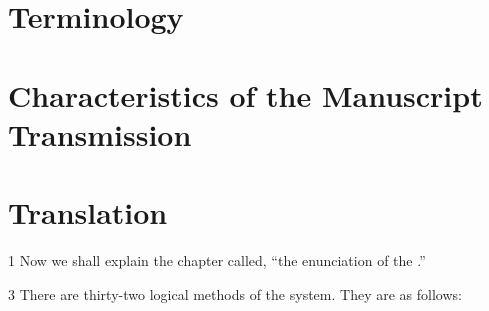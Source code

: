 \section{Terminology}



\section{Characteristics of the Manuscript Transmission}


\section{Translation}

\begin{translation}

\item [1] Now we shall explain the chapter called, “the enunciation of the
.”

\item [3] There are thirty-two logical methods of the system. They are as 
follows: 
\smallskip



\end{translation}
